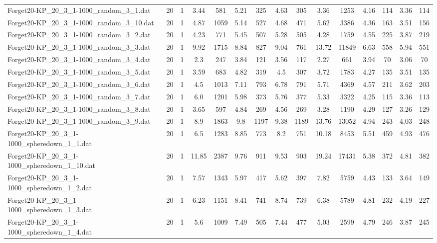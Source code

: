\begin{table}[!ht]
{\begin{tabular}{lcccccccccccccc}
Forget20-KP\_20\_3\_1-1000\_random\_3\_1.dat & 20 & 1 & 3.44 & 581 & 5.21 & 325 & 4.63 & 305 & 3.36 & 1253 & 4.16 & 114 & 3.36 & 114 \\
Forget20-KP\_20\_3\_1-1000\_random\_3\_10.dat & 20 & 1 & 4.87 & 1059 & 5.14 & 527 & 4.68 & 471 & 5.62 & 3386 & 4.36 & 163 & 3.51 & 156 \\
Forget20-KP\_20\_3\_1-1000\_random\_3\_2.dat & 20 & 1 & 4.23 & 771 & 5.45 & 507 & 5.28 & 505 & 4.28 & 1759 & 4.55 & 225 & 3.87 & 219 \\
Forget20-KP\_20\_3\_1-1000\_random\_3\_3.dat & 20 & 1 & 9.92 & 1715 & 8.84 & 827 & 9.04 & 761 & 13.72 & 11849 & 6.63 & 558 & 5.94 & 551 \\
Forget20-KP\_20\_3\_1-1000\_random\_3\_4.dat & 20 & 1 & 2.3 & 247 & 3.84 & 121 & 3.56 & 117 & 2.27 & 661 & 3.94 & 70 & 3.06 & 70 \\
Forget20-KP\_20\_3\_1-1000\_random\_3\_5.dat & 20 & 1 & 3.59 & 683 & 4.82 & 319 & 4.5 & 307 & 3.72 & 1783 & 4.27 & 135 & 3.51 & 135 \\
Forget20-KP\_20\_3\_1-1000\_random\_3\_6.dat & 20 & 1 & 4.5 & 1013 & 7.11 & 793 & 6.78 & 791 & 5.71 & 4369 & 4.57 & 211 & 3.62 & 203 \\
Forget20-KP\_20\_3\_1-1000\_random\_3\_7.dat & 20 & 1 & 6.0 & 1201 & 5.98 & 373 & 5.76 & 377 & 5.33 & 3322 & 4.25 & 115 & 3.36 & 113 \\
Forget20-KP\_20\_3\_1-1000\_random\_3\_8.dat & 20 & 1 & 3.65 & 597 & 4.84 & 269 & 4.56 & 269 & 3.28 & 1190 & 4.29 & 127 & 3.26 & 129 \\
Forget20-KP\_20\_3\_1-1000\_random\_3\_9.dat & 20 & 1 & 8.9 & 1863 & 9.8 & 1197 & 9.38 & 1189 & 13.76 & 13052 & 4.94 & 243 & 4.03 & 248 \\
Forget20-KP\_20\_3\_1-1000\_spheredown\_1\_1.dat & 20 & 1 & 6.5 & 1283 & 8.85 & 773 & 8.2 & 751 & 10.18 & 8453 & 5.51 & 459 & 4.93 & 476 \\
Forget20-KP\_20\_3\_1-1000\_spheredown\_1\_10.dat & 20 & 1 & 11.85 & 2387 & 9.76 & 911 & 9.53 & 903 & 19.24 & 17431 & 5.38 & 372 & 4.81 & 382 \\
Forget20-KP\_20\_3\_1-1000\_spheredown\_1\_2.dat & 20 & 1 & 7.57 & 1343 & 5.97 & 417 & 5.62 & 397 & 7.82 & 5759 & 4.43 & 133 & 3.64 & 149 \\
Forget20-KP\_20\_3\_1-1000\_spheredown\_1\_3.dat & 20 & 1 & 6.23 & 1151 & 8.41 & 741 & 8.74 & 739 & 6.38 & 5789 & 4.81 & 232 & 4.19 & 227 \\
Forget20-KP\_20\_3\_1-1000\_spheredown\_1\_4.dat & 20 & 1 & 5.6 & 1009 & 7.49 & 505 & 7.44 & 477 & 5.03 & 2599 & 4.79 & 246 & 3.87 & 245 \\

\end{tabular}}
\end{table}
